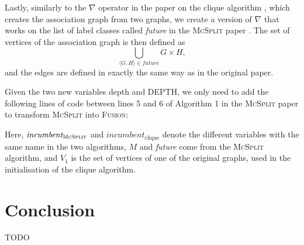 \documentclass{l4proj}
\theoremstyle{definition}
\theoremstyle{remark}
\begin{document}
Lastly, similarly to the $\nabla$ operator in the paper on the clique
algorithm \cite{DBLP:conf/cp/McCreeshNPS16}, which creates the association graph
from two graphs, we create a version of $\nabla$ that works on the list of label
classes called \textit{future} in the \textsc{McSplit} paper
\cite{DBLP:conf/ijcai/McCreeshPT17}. The set of vertices of the association
graph is then defined as
\[ \bigcup_{\langle G, H \rangle \in \textit{future}} G \times H, \]
and the edges are defined in exactly the same way as in the original paper.

Given the two new variables \textsf{depth} and \textsf{DEPTH}, we only need to
add the following lines of code between lines 5 and 6 of Algorithm 1 in the
\textsc{McSplit} paper to transform \textsc{McSplit} into \textsc{Fusion}:

\begin{algorithm}
\end{algorithm}

Here, $\textit{incumbent}_{\textsc{McSplit}}$ and
$\textit{incumbent}_{\text{clique}}$ denote the different variables with the
same name in the two algorithms, $M$ and \textit{future} come from the
\textsc{McSplit} algorithm, and $V_1$ is the set of vertices of one of the
original graphs, used in the initialisation of the clique algorithm.

\chapter{Conclusion}

TODO




\end{document}
